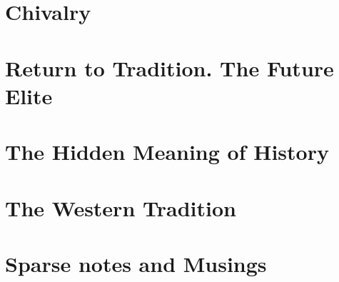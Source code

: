 \documentclass[a4paper,12pt,twoside]{book}
\begin{document}
\chapter{Chivalry}


\chapter{Return to Tradition. The Future Elite}





\chapter{The Hidden Meaning of History}




\chapter{The Western Tradition}


\chapter{Sparse notes and Musings}

\end{document}
